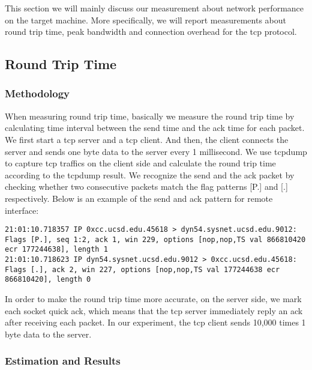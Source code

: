 
% 

This section we will mainly discuss our measurement about network performance on the target machine. More specifically, we will report measurements about round trip time, peak bandwidth and connection overhead for the tcp protocol.

\subsection{Round Trip Time}

\subsubsection{Methodology}

When measuring round trip time, basically we measure the round trip time by calculating time interval between the send time and the ack time for each packet. We first start a tcp server and a tcp client. And then, the client connects the server and sends one byte data to the server every 1 millisecond. We use tcpdump to capture tcp traffics on the client side and calculate the round trip time according to the tcpdump result.  We recognize the send and the ack packet by checking whether two consecutive packets match the flag patterns [P.] and [.] respectively. Below is an example of the send and ack pattern for remote interface:

\begin{lstlisting}
21:01:10.718357 IP 0xcc.ucsd.edu.45618 > dyn54.sysnet.ucsd.edu.9012: Flags [P.], seq 1:2, ack 1, win 229, options [nop,nop,TS val 866810420 ecr 177244638], length 1
21:01:10.718623 IP dyn54.sysnet.ucsd.edu.9012 > 0xcc.ucsd.edu.45618: Flags [.], ack 2, win 227, options [nop,nop,TS val 177244638 ecr 866810420], length 0
\end{lstlisting}

In order to make the round trip time more accurate, on the server side, we mark each socket quick ack, which means that the tcp server immediately reply an ack after receiving each packet. In our experiment, the tcp client sends 10,000 times 1 byte data to the server.

\subsubsection{Estimation and Results}

